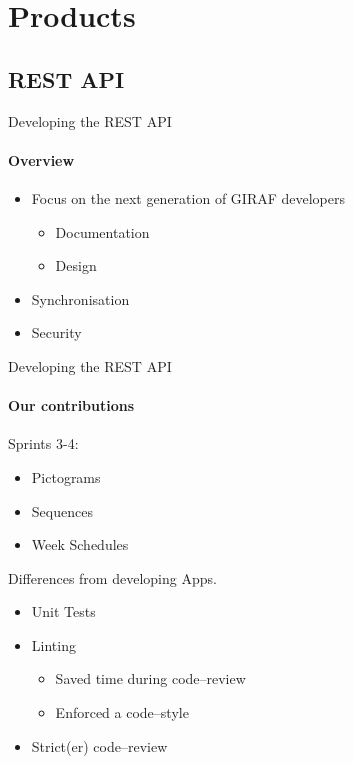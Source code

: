 \section{Products}
    \subsection{REST API}
        \begin{frame}[t]{Developing the REST API}\framesubtitle{Overview}
            \begin{itemize}
                \item Focus on the next generation of GIRAF developers
                \begin{itemize}
                    \item Documentation
                    \item Design
                \end{itemize}
                \item Synchronisation
                \item Security
            \end{itemize}
        \end{frame}

        \begin{frame}[t]{Developing the REST API}\framesubtitle{Our contributions}
            Sprints 3-4:
            \begin{itemize}
                \item Pictograms
                \item Sequences
                \item Week Schedules
            \end{itemize}
            \bigskip
            Differences from developing Apps.
            \begin{itemize}
                \item Unit Tests
                \item Linting
                \begin{itemize}
                    \item Saved time during code--review
                    \item Enforced a code--style
                \end{itemize}
                \item Strict(er) code--review
            \end{itemize}
        \end{frame}

